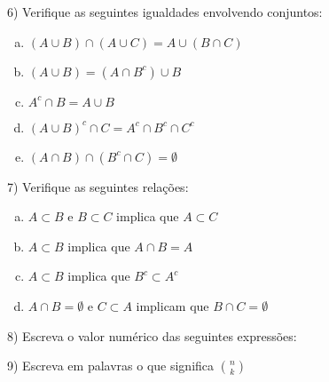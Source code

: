\documentclass{article}
\begin{document}
6) Verifique as seguintes igualdades envolvendo conjuntos:

\begin{enumerate}[a)] %
    \item $(A\cup B)\cap (A \cup C) = A \cup (B \cap C)$
    \item $(A \cup B) = (A \cap B^c)\cup B$
    \item $A^c \cap B = A \cup B$
    \item $(A\cup B)^c \cap C = A^c \cap B^c \cap C^c$
    \item $(A \cap B) \cap (B^c \cap C) = \emptyset$
\end{enumerate}
\vspace{10px}

7) Verifique as seguintes relações:

\begin{enumerate}[a)] %
    \item $A \subset B$ e $B \subset C$ implica que $A \subset C$
    \item $A \subset B$ implica que $A\cap B = A$
    \item $A \subset B$ implica que $B^c \subset A^c$
    \item $A \cap B = \emptyset $ e $ C \subset A$ implicam que $B \cap C = \emptyset$ 
\end{enumerate}

8) Escreva o valor numérico das seguintes expressões:


9) Escreva em palavras o que significa $$
\end{document}
